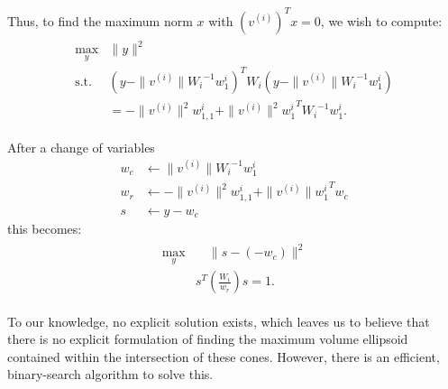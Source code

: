 Thus, to find the maximum norm $x$ with $\left(v^{(i)}\right)^Tx = 0$, we wish to compute:
\begin{align*}
\begin{array}{cc}
\max_{y}  & \|y\|^2  \\
 \textrm{s.t.} & \left(y - \|v^{(i)}\|{W_i}^{-1}{w_1^i}\right)^T{W_i}\left(y - \|v^{(i)}\|{W_i}^{-1}{w_1^i}\right)\\
 & = - \|v^{(i)}\|^2{w_{1,1}^i} + \|v^{(i)}\|^2{{w_1^i}}^T{W_i}^{-1}{w_1^i}.
 \end{array}
\end{align*}

After a change of variables
\begin{align*}
w_c &\gets \|v^{(i)}\|{W_i}^{-1}w_1^i \\
w_r &\gets  - \|v^{(i)}\|^2{w_{1,1}^i} + \|v^{(i)}\|{{w_1^i}}^Tw_c \\
s &\gets y - w_c
\end{align*}
this becomes:
\begin{align}
\label{cone_feasibility_check}
\begin{array}{ccc}
\max_{y} & \quad \|s - \left(-w_c\right)\|^2  \\
 & s^T\left(\frac {W_i}{w_r}\right)s = 1.
 \end{array}
\end{align}

To our knowledge, no explicit solution exists, 
which leaves us to believe that there is no explicit formulation of finding the maximum volume ellipsoid contained within the intersection of these cones.  
However, there is an efficient, binary-search algorithm to solve this.


